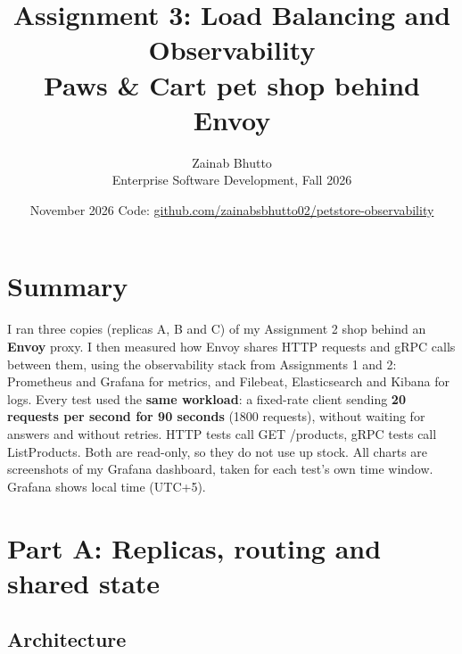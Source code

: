 \documentclass[10pt,a4paper]{article}
\title{\vspace{-1.2cm}Assignment 3: Load Balancing and Observability\\[2pt]
\large Paws \& Cart pet shop behind Envoy}
\author{Zainab Bhutto \\ \small Enterprise Software Development, Fall 2026}
\date{\small November 2026 \quad Code: \href{https://github.com/zainabsbhutto02/petstore-observability}{github.com/zainabsbhutto02/petstore-observability}}
\newcommand{\codeus}{\textunderscore\allowbreak}
\newcommand{\code}[1]{{\small\ttfamily\let\_\codeus #1}}
\begin{document}
\maketitle
\vspace{-0.5cm}

\section*{Summary}

I ran three copies (replicas A, B and C) of my Assignment 2 shop behind an \textbf{Envoy} proxy. I then measured
how Envoy shares HTTP requests and gRPC calls between them, using the observability stack from Assignments 1 and 2:
Prometheus and Grafana for metrics, and Filebeat, Elasticsearch and Kibana for logs. Every test used the
\textbf{same workload}: a fixed-rate client sending \textbf{20 requests per second for 90 seconds} (1800 requests),
without waiting for answers and without retries. HTTP tests call \code{GET /products}, gRPC tests call
\code{ListProducts}. Both are read-only, so they do not use up stock. All charts are screenshots of my Grafana
dashboard, taken for each test's own time window. Grafana shows local time (UTC+5).

\section{Part A: Replicas, routing and shared state}

\subsection{Architecture}
\end{document}
